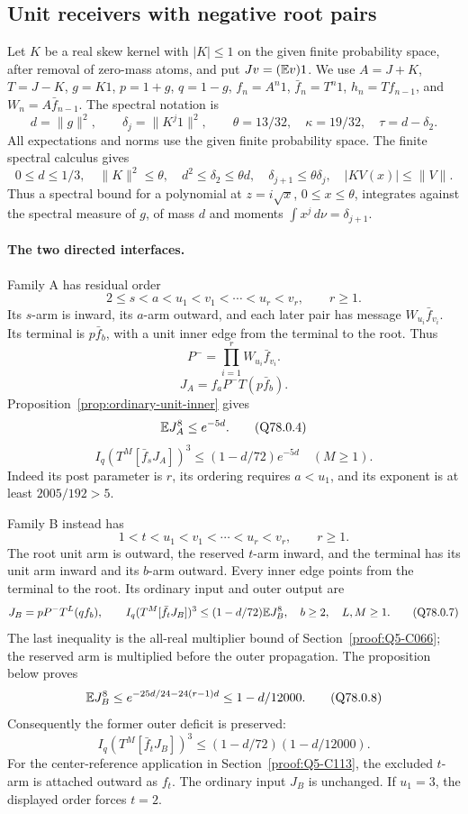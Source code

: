 \subsection{Unit receivers with negative root pairs}\label{proof:Q5-C078}

Let \(K\) be a real skew kernel with \(|K|\le1\) on the given finite
probability space, after removal of zero-mass atoms, and put
\(Jv=(\mathbb E v)1\). We use \(A=J+K\), \(T=J-K\), \(g=K1\), \(p=1+g\), \(q=1-g\),
\(f_n=A^n1\), \(\bar f_n=T^n1\), \(h_n=Tf_{n-1}\), and
\(W_n=A\bar f_{n-1}\). The spectral notation is
\[
 d=\|g\|^2,\qquad \delta_j=\|K^j1\|^2,\qquad
 \theta=13/32,\quad\kappa=19/32,\quad\tau=d-\delta_2.
\]
All expectations and norms use the given finite probability space.
The finite spectral calculus gives
\[
 0\le d\le1/3,\quad \|K\|^2\le\theta,\quad
 d^2\le\delta_2\le\theta d,\quad
 \delta_{j+1}\le\theta\delta_j,\quad |KV(x)|\le\|V\|.
\]
Thus a spectral bound for a polynomial at \(z=i\sqrt x\),
\(0\le x\le\theta\), integrates against the spectral measure of \(g\),
of mass \(d\) and moments \(\int x^j\,d\nu=\delta_{j+1}\).

\paragraph{The two directed interfaces.}
Family A has residual order
\[
 2\le s<a<u_1<v_1<\cdots<u_r<v_r,\qquad r\ge1.
 \tag{Q78.0.1}
\]
Its \(s\)-arm is inward, its \(a\)-arm outward, and each later pair
has message \(W_{u_i}\bar f_{v_i}\). Its terminal is \(p\bar f_b\),
with a unit inner edge from the terminal to the root. Thus
\[
 P^-=\prod_{i=1}^rW_{u_i}\bar f_{v_i}.
 \tag{Q78.0.2}
\]
\[
 J_A=f_aP^-T(p\bar f_b).
 \tag{Q78.0.3}
\]
Proposition~\ref{prop:ordinary-unit-inner} gives
\[
 \mathbb E J_A^8\le e^{-5d}.
 \tag{Q78.0.4}
\]
\[
 I_q(T^M[\bar f_sJ_A])^3\le(1-d/72)e^{-5d}
 \quad(M\ge1).
 \tag{Q78.0.5}
\]
Indeed its post parameter is \(r\), its ordering requires \(a<u_1\),
and its exponent is at least \(2005/192>5\).

Family B instead has
\[
 1<t<u_1<v_1<\cdots<u_r<v_r,\qquad r\ge1.
 \tag{Q78.0.6}
\]
The root unit arm is outward, the reserved \(t\)-arm inward, and the
terminal has its unit arm inward and its \(b\)-arm outward. Every
inner edge points from the terminal to the root. Its ordinary input
and outer output are
\[
 J_B=pP^-T^L(qf_b),\qquad
 I_q(T^M[\bar f_tJ_B])^3
 \le(1-d/72)\mathbb E J_B^8,\quad b\ge2,\quad L,M\ge1.
 \tag{Q78.0.7}
\]
The last inequality is the all-real multiplier bound of
Section~\ref{proof:Q5-C066}; the reserved arm is multiplied before
the outer propagation. The proposition below proves
\[
 \mathbb E J_B^8\le e^{-25d/24-24(r-1)d}\le1-d/12000.
 \tag{Q78.0.8}
\]
Consequently the former outer deficit is preserved:
\[
 I_q(T^M[\bar f_tJ_B])^3
 \le(1-d/72)(1-d/12000).
 \tag{Q78.0.9}
\]
For the center-reference application in Section~\ref{proof:Q5-C113},
the excluded \(t\)-arm is attached outward as \(f_t\). The ordinary
input \(J_B\) is unchanged. If \(u_1=3\), the displayed order forces
\(t=2\).

